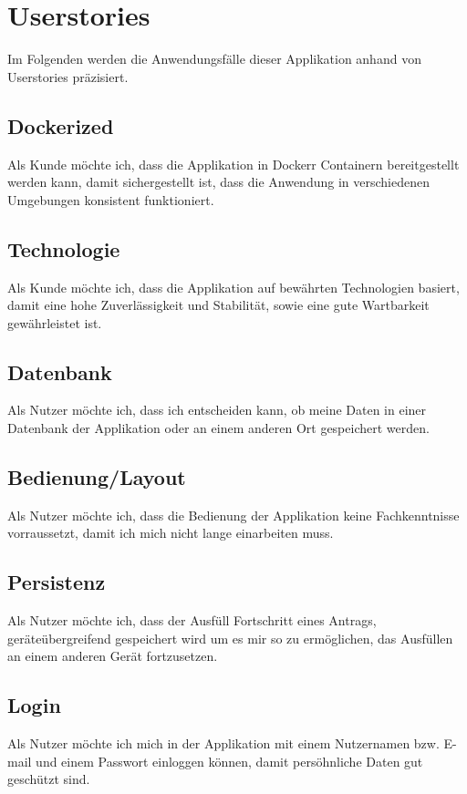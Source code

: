 \chapter{Userstories}\label{ch:userstories}
Im Folgenden werden die Anwendungsfälle dieser Applikation anhand von Userstories präzisiert.
\section{Dockerized}
Als Kunde möchte ich, dass die Applikation in Dockerr Containern bereitgestellt werden kann, damit 
sichergestellt ist, dass die Anwendung in verschiedenen Umgebungen konsistent funktioniert.

\section{Technologie}
Als Kunde möchte ich, dass die Applikation auf bewährten Technologien basiert, damit eine hohe
Zuverlässigkeit und Stabilität, sowie eine gute Wartbarkeit gewährleistet ist.

\section{Datenbank}
Als Nutzer möchte ich, dass ich entscheiden kann, ob meine Daten in einer Datenbank der Applikation oder an einem anderen Ort gespeichert werden.

\section{Bedienung/Layout}
Als Nutzer möchte ich, dass die Bedienung der Applikation keine Fachkenntnisse vorraussetzt, damit 
ich mich nicht lange einarbeiten muss.

\section{Persistenz}
Als Nutzer möchte ich, dass der Ausfüll Fortschritt eines Antrags, geräteübergreifend gespeichert wird
um es mir so zu ermöglichen, das Ausfüllen an einem anderen Gerät fortzusetzen.




\section{Login}
Als Nutzer möchte ich mich in der Applikation mit einem Nutzernamen bzw. E-mail und einem Passwort
einloggen können, damit persöhnliche Daten gut geschützt sind.
